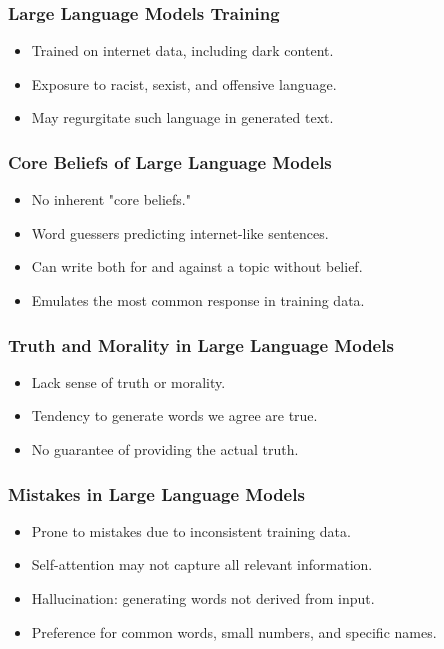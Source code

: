 \begin{frame}[fragile]\frametitle{Large Language Models Training}
  \begin{itemize}
    \item Trained on internet data, including dark content.
    \item Exposure to racist, sexist, and offensive language.
    \item May regurgitate such language in generated text.
  \end{itemize}
\end{frame}

\begin{frame}[fragile]\frametitle{Core Beliefs of Large Language Models}
  \begin{itemize}
    \item No inherent "core beliefs."
    \item Word guessers predicting internet-like sentences.
    \item Can write both for and against a topic without belief.
    \item Emulates the most common response in training data.
  \end{itemize}
\end{frame}

\begin{frame}[fragile]\frametitle{Truth and Morality in Large Language Models}
  \begin{itemize}
    \item Lack sense of truth or morality.
    \item Tendency to generate words we agree are true.
    \item No guarantee of providing the actual truth.
  \end{itemize}
\end{frame}

\begin{frame}[fragile]\frametitle{Mistakes in Large Language Models}
  \begin{itemize}
    \item Prone to mistakes due to inconsistent training data.
    \item Self-attention may not capture all relevant information.
    \item Hallucination: generating words not derived from input.
    \item Preference for common words, small numbers, and specific names.
  \end{itemize}
\end{frame}

